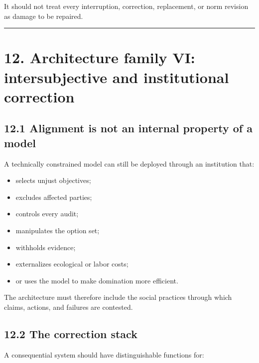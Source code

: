 \documentclass[
  11pt,
]{article}
\providecommand{\tightlist}{%
  \setlength{\itemsep}{0pt}\setlength{\parskip}{0pt}}
\begin{document}
It should not treat every interruption, correction, replacement, or norm
revision as damage to be repaired.

\begin{center}\rule{0.5\linewidth}{0.5pt}\end{center}

\section{12. Architecture family VI: intersubjective and institutional
correction}\label{architecture-family-vi-intersubjective-and-institutional-correction}

\subsection{12.1 Alignment is not an internal property of a
model}\label{alignment-is-not-an-internal-property-of-a-model}

A technically constrained model can still be deployed through an
institution that:

\begin{itemize}
\tightlist
\item
  selects unjust objectives;
\item
  excludes affected parties;
\item
  controls every audit;
\item
  manipulates the option set;
\item
  withholds evidence;
\item
  externalizes ecological or labor costs;
\item
  or uses the model to make domination more efficient.
\end{itemize}

The architecture must therefore include the social practices through
which claims, actions, and failures are contested.

\subsection{12.2 The correction stack}\label{the-correction-stack}

A consequential system should have distinguishable functions for:
\end{document}
